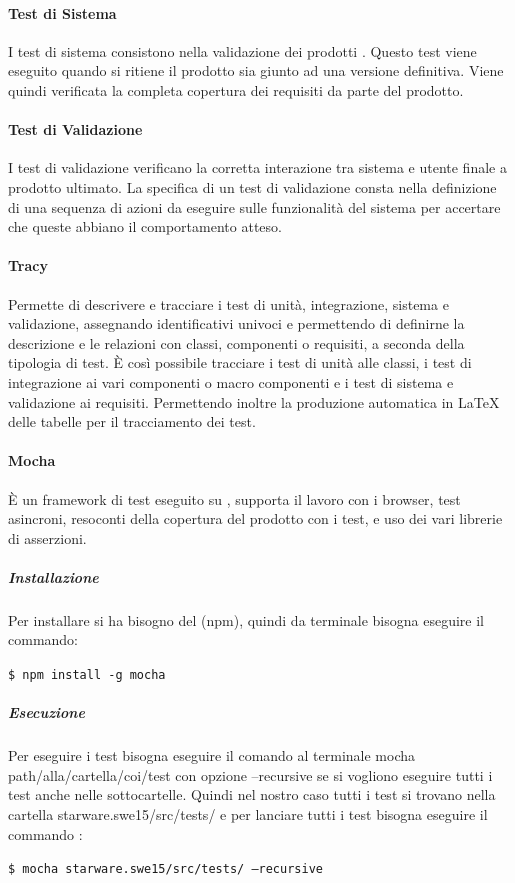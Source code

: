 \documentclass[12pt,a4paper]{article}
\begin{document}
\paragraph{Test di Sistema}

I test di sistema consistono nella validazione dei prodotti . Questo test viene eseguito quando si ritiene il prodotto sia giunto ad una versione definitiva. Viene quindi verificata la completa copertura dei requisiti da parte del prodotto.

\paragraph{Test di Validazione}

I test di validazione verificano la corretta interazione tra sistema e utente finale a prodotto ultimato.
La specifica di un test di validazione consta nella definizione di una sequenza di azioni da eseguire sulle funzionalità del sistema per accertare che queste abbiano il comportamento atteso.


\paragraph{Tracy}\label{tracciamentoTest}

Permette di descrivere e tracciare i test di unità, integrazione, sistema e validazione, assegnando identificativi univoci e permettendo di definirne la descrizione e le relazioni con classi, componenti o requisiti, a seconda della tipologia di test. È così possibile tracciare i test di unità alle classi, i test di integrazione ai vari componenti o macro componenti e i test di sistema e validazione ai requisiti.
Permettendo inoltre la produzione automatica in \LaTeX{} delle tabelle per il tracciamento dei test.
\paragraph{Mocha}\label{strumentoTest}

È un framework di test eseguito su , supporta il lavoro con i browser, test asincroni, resoconti della copertura del prodotto con i test, e uso dei vari librerie di asserzioni.
\subparagraph{Installazione}
Per installare  si ha bisogno del  (npm), quindi da terminale bisogna eseguire il commando:
\begin{center}
	\texttt{\$ npm install -g mocha}  
\end{center}
\subparagraph{Esecuzione}
Per eseguire i test bisogna eseguire il comando al terminale mocha path/alla/cartella/coi/test con opzione --recursive se si vogliono eseguire tutti i test anche nelle sottocartelle.
Quindi nel nostro caso tutti i test si trovano nella cartella starware.swe15/src/tests/ e per lanciare tutti i test bisogna eseguire il commando : 
\begin{center}
	\texttt{\$ mocha starware.swe15/src/tests/ --recursive
}
\end{center}
\newpage
\end{document}
